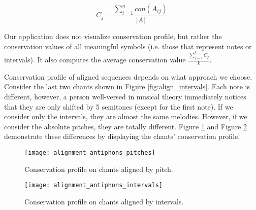 \[
    C_j = \frac{\sum^n_{i=1}con(A_{ij})}{|A|}
\]

Our application does not visualize conservation profile, but rather the conservation values of all meaningful symbols (i.e. those that represent notes or intervals). It
also computes the average conservation value $\frac{\sum^k_{j=1} C_j}{k}$.

Conservation profile of aligned sequences depends on what approach we choose. Consider the last two chants shown in Figure \ref{fig:align_intervals}. Each note
is different, however, a person well-versed in musical theory immediately notices that they are only shifted by 5 semitones (except for the first note). If we consider only
the intervals, they are almost the same melodies. However, if we consider the absolute pitches, they are totally different. Figure \ref{fig:cons_pitch}
and Figure \ref{fig:cons_intervals} demonstrate these differences by displaying the chants' conservation profile.

\begin{figure}[h]
\centering
\texttt{[image: alignment\_antiphons\_pitches]}
\caption{Conservation profile on chants aligned by pitch.}
\label{fig:cons_pitch}
\end{figure}

\begin{figure}[h]
\centering
\texttt{[image: alignment\_antiphons\_intervals]}
\caption{Conservation profile on chants aligned by intervals.}
\label{fig:cons_intervals}
\end{figure}
